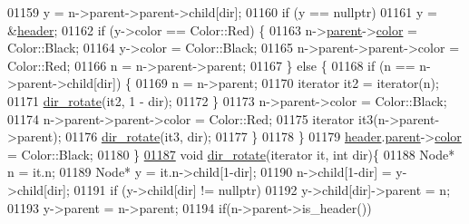 \begin{DoxyCode}
01159             y = n->parent->parent->child[dir];
01160             \textcolor{keywordflow}{if} (y == \textcolor{keyword}{nullptr})
01161                 y = &\hyperlink{classaed2_1_1map_a92d93f905c8ad73fba18fdc7e8915cce_a92d93f905c8ad73fba18fdc7e8915cce}{header};
01162             \textcolor{keywordflow}{if} (y->color == Color::Red) \{
01163                 n->\hyperlink{structaed2_1_1map_1_1Node_ab6a5f9e471b311755e4a56834086cb90_ab6a5f9e471b311755e4a56834086cb90}{parent}->\hyperlink{structaed2_1_1map_1_1Node_a58dd9993fee8ee3eaa5716b72a3eca47_a58dd9993fee8ee3eaa5716b72a3eca47}{color} = Color::Black;
01164                 y->color = Color::Black;
01165                 n->parent->parent->color = Color::Red;
01166                 n = n->parent->parent;
01167             \} \textcolor{keywordflow}{else} \{
01168                 \textcolor{keywordflow}{if} (n == n->parent->child[dir]) \{
01169                     n = n->parent;
01170                     iterator it2 = iterator(n);
01171                     \hyperlink{classaed2_1_1map_a94f2862ada0c9ed4f4457eac42ea8f23_a94f2862ada0c9ed4f4457eac42ea8f23}{dir\_rotate}(it2, 1 - dir);
01172                 \}
01173                     n->parent->color = Color::Black;
01174                     n->parent->parent->color = Color::Red;
01175                     iterator it3(n->parent->parent);
01176                     \hyperlink{classaed2_1_1map_a94f2862ada0c9ed4f4457eac42ea8f23_a94f2862ada0c9ed4f4457eac42ea8f23}{dir\_rotate}(it3, dir);
01177             \}
01178         \}
01179         \hyperlink{classaed2_1_1map_a92d93f905c8ad73fba18fdc7e8915cce_a92d93f905c8ad73fba18fdc7e8915cce}{header}.\hyperlink{structaed2_1_1map_1_1Node_ab6a5f9e471b311755e4a56834086cb90_ab6a5f9e471b311755e4a56834086cb90}{parent}->\hyperlink{structaed2_1_1map_1_1Node_a58dd9993fee8ee3eaa5716b72a3eca47_a58dd9993fee8ee3eaa5716b72a3eca47}{color} = Color::Black;
01180     \}
\hyperlink{classaed2_1_1map_a94f2862ada0c9ed4f4457eac42ea8f23_a94f2862ada0c9ed4f4457eac42ea8f23}{01187}     \textcolor{keywordtype}{void} \hyperlink{classaed2_1_1map_a94f2862ada0c9ed4f4457eac42ea8f23_a94f2862ada0c9ed4f4457eac42ea8f23}{dir\_rotate}(iterator it, \textcolor{keywordtype}{int} dir)\{
01188         Node* n = it.n;
01189         Node* y = it.n->child[1-dir];
01190         n->child[1-dir] = y->child[dir];
01191         \textcolor{keywordflow}{if} (y->child[dir] != \textcolor{keyword}{nullptr})
01192             y->child[dir]->parent = n;
01193         y->parent = n->parent;
01194         \textcolor{keywordflow}{if}(n->parent->is\_header())

\end{DoxyCode}
